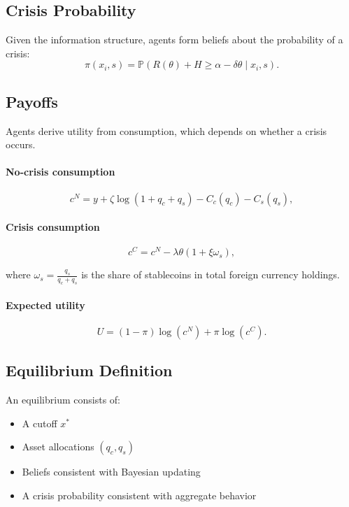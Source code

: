 \subsection{Crisis Probability}

Given the information structure, agents form beliefs about the probability of a crisis:
\begin{equation}
\pi(x_i, s) = \mathbb{P}\left(R(\theta) + H \geq \alpha - \delta \theta \mid x_i, s\right).
\end{equation}

\subsection{Payoffs}

Agents derive utility from consumption, which depends on whether a crisis occurs.

\paragraph{No-crisis consumption}
\begin{equation}
c^N = y + \zeta \log(1 + q_c + q_s) - C_c(q_c) - C_s(q_s),
\end{equation}

\paragraph{Crisis consumption}
\begin{equation}
c^C = c^N - \lambda \theta (1 + \xi \omega_s),
\end{equation}

where $\omega_s = \frac{q_s}{q_c + q_s}$ is the share of stablecoins in total foreign currency holdings.

\paragraph{Expected utility}
\begin{equation}
U = (1 - \pi) \log(c^N) + \pi \log(c^C).
\end{equation}

\subsection{Equilibrium Definition}

An equilibrium consists of:
\begin{itemize}
\item A cutoff $x^*$
\item Asset allocations $(q_c, q_s)$
\item Beliefs consistent with Bayesian updating
\item A crisis probability consistent with aggregate behavior
\end{itemize}

